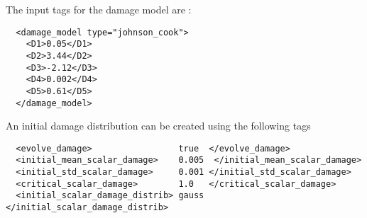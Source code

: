 The input tags for the damage model are :
\lstset{language=XML}
\begin{lstlisting}
  <damage_model type="johnson_cook">
    <D1>0.05</D1>
    <D2>3.44</D2>
    <D3>-2.12</D3>
    <D4>0.002</D4>
    <D5>0.61</D5>
  </damage_model>
\end{lstlisting}

An initial damage distribution can be created using the following tags
\lstset{language=XML}
\begin{lstlisting}
  <evolve_damage>                 true  </evolve_damage>
  <initial_mean_scalar_damage>    0.005  </initial_mean_scalar_damage>
  <initial_std_scalar_damage>     0.001 </initial_std_scalar_damage>
  <critical_scalar_damage>        1.0   </critical_scalar_damage>
  <initial_scalar_damage_distrib> gauss </initial_scalar_damage_distrib>
\end{lstlisting}

